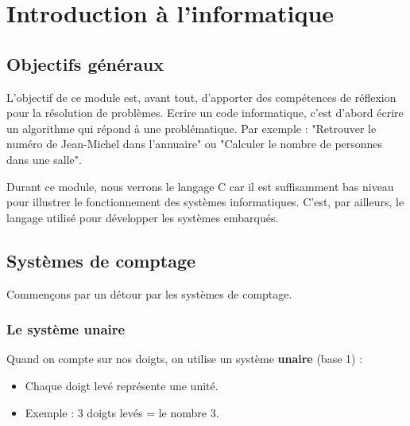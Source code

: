 
\section{Introduction à l’informatique}
\subsection{Objectifs généraux}

L'objectif de ce module est, avant tout, d'apporter des compétences de réflexion pour la résolution de problèmes. 
Ecrire un code informatique, c'est d'abord écrire un algorithme qui répond à une problématique. Par exemple : "Retrouver le numéro de Jean-Michel dans l'annuaire" ou "Calculer le nombre de personnes dans une salle".

Durant ce module, nous verrons le langage C car il est suffisamment bas niveau pour illustrer le fonctionnement des systèmes informatiques. C'est, par ailleurs, le langage utilisé pour développer les systèmes embarqués.


\subsection{Systèmes de comptage}
Commençons par un détour par les systèmes de comptage. 

\subsubsection{Le système unaire}

Quand on compte sur nos doigts, on utilise un système \textbf{unaire} (base 1) :
\begin{itemize}
	\item Chaque doigt levé représente une unité.
	\item Exemple : 3 doigts levés = le nombre 3.
\end{itemize}

